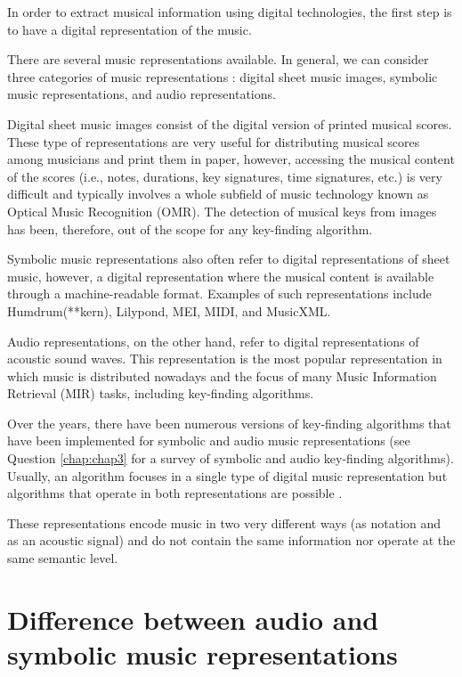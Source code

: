 In order to extract musical information using digital technologies, the first step is to have a digital representation of the music.

There are several music representations available. In general, we can consider three categories of music representations \cite{muller_music_2015}: digital sheet music images, symbolic music representations, and audio representations.

Digital sheet music images consist of the digital version of printed musical scores. These type of representations are very useful for distributing musical scores among musicians and print them in paper, however, accessing the musical content of the scores (i.e., notes, durations, key signatures, time signatures, etc.) is very difficult and typically involves a whole subfield of music technology known as Optical Music Recognition (OMR). The detection of musical keys from images has been, therefore, out of the scope for any key-finding algorithm.

Symbolic music representations also often refer to digital representations of sheet music, however, a digital representation where the musical content is available through a machine-readable format. Examples of such representations include Humdrum(**kern), Lilypond, MEI, MIDI, and MusicXML.

Audio representations, on the other hand, refer to digital representations of acoustic sound waves. This representation is the most popular representation in which music is distributed nowadays and the focus of many Music Information Retrieval (MIR) tasks, including key-finding algorithms.

Over the years, there have been numerous versions of key-finding algorithms that have been implemented for symbolic and audio music representations (see Question \ref{chap:chap3} for a survey of symbolic and audio key-finding algorithms). Usually, an algorithm focuses in a single type of digital music representation but algorithms that operate in both representations are possible \cite{napoles_lopez_key-finding_2019}.

These representations encode music in two very different ways (as notation and as an acoustic signal) and do not contain the same information nor operate at the same semantic level.

\section{Difference between audio and symbolic music representations}

